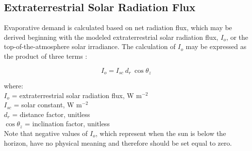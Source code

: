 \subsection{Extraterrestrial Solar Radiation Flux}
\label{sec:ra}
Evaporative demand is calculated based on net radiation flux, which may be derived beginning with the modeled extraterrestrial solar radiation flux, $I_o$, or the top-of-the-atmosphere solar irradiance. 
The calculation of $I_o$ may be expressed as the product of three terms \parencite[Eq.~1.10.2]{duffie13}:

%
\begin{equation}
\label{eq:etsr}
    I_o = I_{sc} \: d_{r} \: \cos \theta_z
\end{equation}

\noindent where: \\
\indent $I_{o}$ = extraterrestrial solar radiation flux, W m$^{-2}$ \\
\indent $I_{sc}$ = solar constant, W m$^{-2}$ \\
\indent $d_{r}$ = distance factor, unitless \\
\indent $\cos \theta_z$ = inclination factor, unitless \\

\noindent Note that negative values of $I_o$, which represent when the sun is below the horizon, have no physical meaning and therefore should be set equal to zero.

